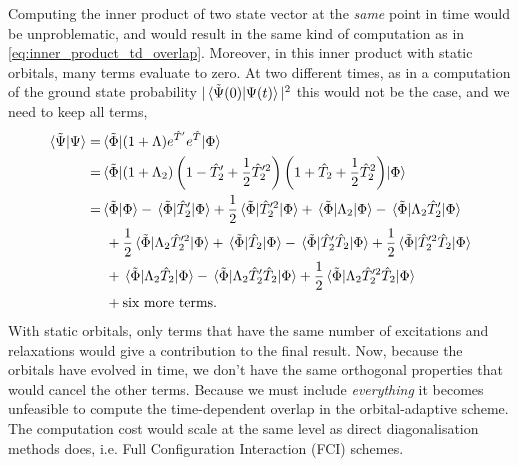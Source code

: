     Computing the inner product of two state vector at the \emph{same} point in 
    time would be unproblematic, and would result in the same kind of 
    computation as in \autoref{eq:inner_product_td_overlap}. Moreover, in this 
    inner product with static orbitals, many terms evaluate to zero. At two different 
    times, as in a computation of the ground state probability
    $|\braket*{\tilde{\Psi}(0)}{\Psi(t)}|^2$ this would not be the case, and we need 
    to keep all terms,
    \begin{equation}
        \begin{aligned}
        \braket*{\tilde{\Psi}}{\Psi}
            =& \mel*{\tilde{\Phi}}{(1 + \Lambda) e^{\hat{T}'}e^{\hat{T}}}{\Phi} \\
            =& \mel*{\tilde{\Phi}}
            {
               \left(1 + \Lambda_2\right)
               \left(1 - \hat{T}'_2 + \frac{1}{2}\hat{T}'^2_2\right) 
               \left(1 + \hat{T}_2 + \frac{1}{2}\hat{T}^2_2\right)
            }
            {\Phi} \\
            =& \braket*{\tilde{\Phi}}{\Phi} - \mel*{\tilde{\Phi}}{\hat{T}'_2}{\Phi} 
                + \frac{1}{2}\mel*{\tilde{\Phi}}{\hat{T}'^2_2}{\Phi}
                + \mel*{\tilde{\Phi}}{\Lambda_2}{\Phi}
                - \mel*{\tilde{\Phi}}{\Lambda_2\hat{T}'_2}{\Phi} \\
            &\ + \frac{1}{2} \mel*{\tilde{\Phi}}{\Lambda_2\hat{T}'^2_2}{\Phi}
                + \mel*{\tilde{\Phi}}{\hat{T}_2}{\Phi}
                - \mel*{\tilde{\Phi}}{\hat{T}'_2\hat{T}_2}{\Phi}
                + \frac{1}{2}\mel*{\tilde{\Phi}}{\hat{T}'^2_2\hat{T}_2}{\Phi} \\
            &\  + \mel*{\tilde{\Phi}}{\Lambda_2\hat{T}_2}{\Phi}
                - \mel*{\tilde{\Phi}}{\Lambda_2\hat{T}'_2\hat{T}_2}{\Phi}
                + \frac{1}{2}\mel*{\tilde{\Phi}}{\Lambda_2\hat{T}'^2_2\hat{T}_2}{\Phi} \\
            &\ + \text{six more terms}.
        \end{aligned}
    \end{equation}
    With static orbitals, only terms that have the same number of excitations and relaxations would 
    give a contribution to the final result. Now, because the orbitals have evolved in time, 
    we don't have the same orthogonal properties that would cancel the other terms. Because we must 
    include \emph{everything} it becomes unfeasible to compute the time-dependent overlap in the 
    orbital-adaptive scheme. The computation cost would scale at the same level as direct diagonalisation 
    methods does, i.e. Full Configuration Interaction (FCI) schemes.

